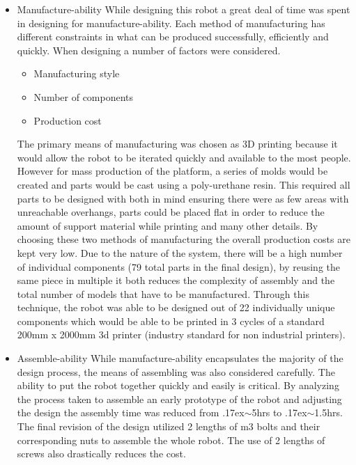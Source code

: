 \documentclass[conference]{IEEEtran}
\newcommand{\approximately}{{\raise.17ex\hbox{$\scriptstyle\mathtt{\sim}$}}}
\begin{document}
\begin{itemize}
        \item Manufacture-ability
        While designing this robot a great deal of time was spent in designing for manufacture-ability. Each method of manufacturing has different constraints in what can be produced successfully, efficiently and quickly. When designing a number of factors were considered. \newline
            \begin{itemize}
                \item Manufacturing style
                \item Number of components
                \item Production cost
            \end{itemize}
        The primary means of manufacturing was chosen as 3D printing because it would allow the robot to be iterated quickly and available to the most people. However for mass production of the platform, a series of molds would be created and parts would be cast using a poly-urethane resin. This required all parts to be designed with both in mind ensuring there were as few areas with unreachable overhangs, parts could be placed flat in order to reduce the amount of support material while printing and many other details. By choosing these two methods of manufacturing the overall production costs are kept very low.\newline
        Due to the nature of the system, there will be a high number of individual components (79 total parts in the final design), by reusing the same piece in multiple it both reduces the complexity of assembly and the total number of models that have to be manufactured. Through this technique, the robot was able to be designed out of 22 individually unique components which would be able to be printed in 3 cycles of a standard 200mm x 2000mm 3d printer (industry standard for non industrial printers).\newline
        \item Assemble-ability
        While manufacture-ability encapsulates the majority of the design process, the means of assembling was also considered carefully. The ability to put the robot together quickly and easily is critical. By analyzing the process taken to assemble an early prototype of the robot and adjusting the design the assembly time was reduced from \approximately 5hrs to \approximately1.5hrs. The final revision of the design utilized 2 lengths of m3 bolts and their corresponding nuts to assemble the whole robot. The use of 2 lengths of screws also drastically reduces the cost. 
        
    \end{itemize}
\end{document}

